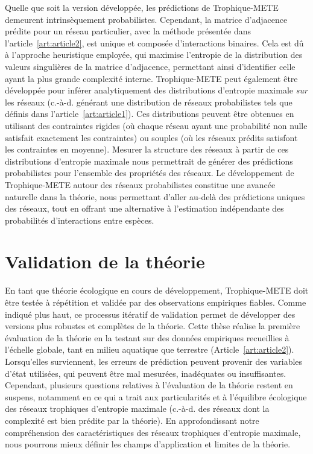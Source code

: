 Quelle que soit la version développée, les prédictions de Trophique-METE
demeurent intrinsèquement probabilistes. Cependant, la matrice d'adjacence
prédite pour un réseau particulier, avec la méthode présentée dans
l'article~\ref{art:article2}, est unique et composée d'interactions binaires.
Cela est dû à l'approche heuristique employée, qui maximise l'entropie de la
distribution des valeurs singulières de la matrice d'adjacence, permettant ainsi
d'identifier celle ayant la plus grande complexité interne. Trophique-METE peut
également être développée pour inférer analytiquement des distributions
d'entropie maximale \textit{sur} les réseaux (c.-à-d. générant une distribution
de réseaux probabilistes tels que définis dans l'article~\ref{art:article1}).
Ces distributions peuvent être obtenues en utilisant des contraintes rigides (où
chaque réseau ayant une probabilité non nulle satisfait exactement les
contraintes) ou souples (où les réseaux prédits satisfont les contraintes en
moyenne). Mesurer la structure des réseaux à partir de ces distributions
d'entropie maximale nous permettrait de générer des prédictions probabilistes
pour l'ensemble des propriétés des réseaux. Le développement de Trophique-METE
autour des réseaux probabilistes constitue une avancée naturelle dans la
théorie, nous permettant d'aller au-delà des prédictions uniques des réseaux,
tout en offrant une alternative à l'estimation indépendante des probabilités
d'interactions entre espèces.  


\section{Validation de la théorie} 

En tant que théorie écologique en cours de développement, Trophique-METE doit
être testée à répétition et validée par des observations empiriques fiables.
Comme indiqué plus haut, ce processus itératif de validation permet de
développer des versions plus robustes et complètes de la théorie. Cette thèse
réalise la première évaluation de la théorie en la testant sur des données
empiriques recueillies à l'échelle globale, tant en milieu aquatique que
terrestre (Article~\ref{art:article2}). Lorsqu'elles surviennent, les erreurs de
prédiction peuvent provenir des variables d'état utilisées, qui peuvent être mal
mesurées, inadéquates ou insuffisantes. Cependant, plusieurs questions relatives
à l'évaluation de la théorie restent en suspens, notamment en ce qui a trait aux
particularités et à l'équilibre écologique des réseaux trophiques d'entropie
maximale (c.-à-d. des réseaux dont la complexité est bien prédite par la
théorie). En approfondissant notre compréhension des caractéristiques des
réseaux trophiques d'entropie maximale, nous pourrons mieux définir les champs
d'application et limites de la théorie.

